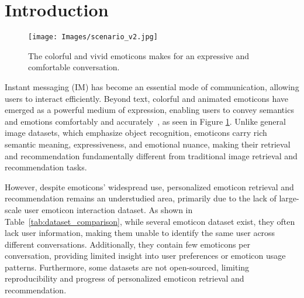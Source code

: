 \section{Introduction}
\label{sec:intro}
\begin{figure}[htbp] 
    \centering \texttt{[image: Images/scenario\_v2.jpg]} 
    \caption{The colorful and vivid emoticons makes for an expressive and comfortable conversation.} 
\label{fig:scenario} 
\end{figure}
Instant messaging (IM) has become an essential mode of communication, allowing users to interact efficiently. Beyond text, colorful and animated emoticons have emerged as a powerful medium of expression, enabling users to convey semantics and emotions comfortably and accurately~\cite{ge2020anatomy, constantin2019computational, kariko2019laughing, gif-interestingess, bitmoji}, as seen in Figure \ref{fig:scenario}.
Unlike general image datasets, which emphasize object recognition, emoticons carry rich semantic meaning, expressiveness, and emotional nuance, making their retrieval and recommendation fundamentally different from traditional image retrieval and recommendation tasks. 

However, despite emoticons' widespread use, personalized emoticon retrieval and recommendation remains an understudied area, primarily due to the lack of large-scale user emoticon interaction dataset.
As shown in Table~\ref{tab:dataset_comparison}, while several emoticon dataset exist, they often lack user information, making them unable to identify the same user across different conversations.
Additionally, they contain few emoticons per conversation, providing limited insight into user preferences or emoticon usage patterns. Furthermore, some datasets are not open-sourced, limiting reproducibility and progress of personalized emoticon retrieval and recommendation.

